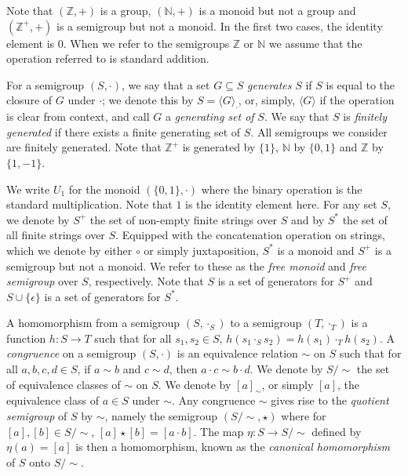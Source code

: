 \documentclass[a4paper,UKenglish,cleveref, autoref, thm-restate, anonymous]{lipics-v2021}
\begin{document}

Note that $(\mathbb{Z},+)$ is a group, $(\mathbb{N},+)$ is a monoid but not a group and $(\mathbb{Z}^+,+)$ is a semigroup but not a monoid.  In the first two cases, the identity element is $0$.  When we refer to the semigroups $\mathbb{Z}$ or $\mathbb{N}$ we assume that the operation referred to is standard addition.

For a semigroup $(S, \cdot)$, we say that a set $G \subseteq S$ \emph{generates} $S$ if $S$ is equal to the closure of $G$ under $\cdot$; we denote this by $S = \langle G \rangle_{\cdot}$, or, simply, $\langle G \rangle$ if the operation is clear from context, and call $G$ a \emph{generating set of} $S$. We say that $S$ is \emph{finitely generated} if there exists a finite generating set of $S$.  All semigroups we consider are finitely generated.  Note that $\mathbb{Z}^+$ is generated by $\{1\}$, $\mathbb{N}$ by $\{0,1\}$ and $\mathbb{Z}$ by $\{1,-1\}$.

We write $U_1$ for the monoid $(\{0,1\},\cdot)$ where the binary operation is the standard multiplication.  Note that $1$ is the identity element here.
For any set $S$, we denote by $S^+$ the set of non-empty finite strings over $S$ and by $S^*$ the set of all finite strings over $S$.  Equipped with the concatenation operation on strings, which we denote by either $\circ$ or simply juxtaposition, $S^*$ is a monoid and $S^+$ is a semigroup but not a monoid.  We refer to these as the \emph{free monoid} and \emph{free semigroup} over $S$, respectively.  Note that $S$ is a set of generators for $S^+$ and $S \cup \{\epsilon\}$ is a set of generators for $S^*$.

A homomorphism from a semigroup $(S, \cdot_S)$ to a semigroup $(T, \cdot_T)$ is a function $h : S \rightarrow T$ such that for all $s_1, s_2 \in S$, $h(s_1 \cdot_S s_2) = h(s_1) \cdot_T h(s_2)$.     A \emph{congruence} on a semigroup $(S, \cdot)$ is an equivalence relation $\sim$ on $S$ such that for all $a,b,c,d \in S$, if $a \sim b$ and $c \sim d$, then $a \cdot c \sim b \cdot d$.  We denote by $S/{\sim}$ the set of equivalence classes of $\sim$ on $S$.  We denote by $[a]_{\sim}$, or simply $[a]$, the equivalence class of $a \in S$ under $\sim$.  Any congruence $\sim$ gives rise to the \emph{quotient semigroup} of $S$ by $\sim$, namely the semigroup $(S/{\sim}, \star)$ where for $[a],[b] \in S/{\sim}$, $[a] \star [b] = [a \cdot b]$.  The map $\eta : S \rightarrow S/{\sim}$ defined by $\eta(a) = [a]$ is then a homomorphism, known as the  \emph{canonical homomorphism} of $S$ onto $S/{\sim}$.
\end{document}
